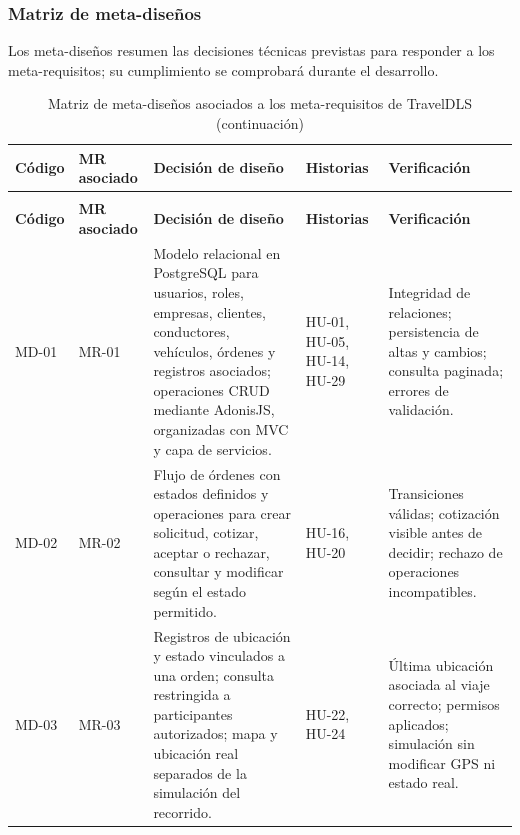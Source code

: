 \subsubsection{Matriz de meta-diseños}

Los meta-diseños resumen las decisiones técnicas previstas para responder a los meta-requisitos; su cumplimiento se comprobará durante el desarrollo.


\begingroup
	\small
	\setlength{\tabcolsep}{4.5pt}
	\renewcommand{\arraystretch}{1.45}
	\begin{longtable}{@{}>{\RaggedRight\arraybackslash}p{1.5cm}>{\RaggedRight\arraybackslash}p{1.8cm}>{\RaggedRight\arraybackslash}p{4.1cm}>{\RaggedRight\arraybackslash}p{2.3cm}>{\RaggedRight\arraybackslash}p{5.3cm}@{}}
		\caption{Matriz de meta-diseños asociados a los meta-requisitos de TravelDLS}\label{tab:meta_disenos}\\
		\toprule
		\textbf{Código} & \textbf{MR asociado} & \textbf{Decisión de diseño} & \textbf{Historias} & \textbf{Verificación} \\
		\midrule
		\endfirsthead
		\caption[]{Matriz de meta-diseños asociados a los meta-requisitos de TravelDLS (continuación)}\\
		\toprule
		\textbf{Código} & \textbf{MR asociado} & \textbf{Decisión de diseño} & \textbf{Historias} & \textbf{Verificación} \\
		\midrule
		\endhead
		\endfoot
		\bottomrule
		\endlastfoot
		MD-01 & MR-01 & Modelo relacional en PostgreSQL para usuarios, roles, empresas, clientes, conductores, vehículos, órdenes y registros asociados; operaciones CRUD mediante AdonisJS, organizadas con MVC y capa de servicios. & HU-01, HU-05, HU-14, HU-29 & Integridad de relaciones; persistencia de altas y cambios; consulta paginada; errores de validación. \\ \midrule
		MD-02 & MR-02 & Flujo de órdenes con estados definidos y operaciones para crear solicitud, cotizar, aceptar o rechazar, consultar y modificar según el estado permitido. & HU-16, HU-20 & Transiciones válidas; cotización visible antes de decidir; rechazo de operaciones incompatibles. \\ \midrule
		MD-03 & MR-03 & Registros de ubicación y estado vinculados a una orden; consulta restringida a participantes autorizados; mapa y ubicación real separados de la simulación del recorrido. & HU-22, HU-24 & Última ubicación asociada al viaje correcto; permisos aplicados; simulación sin modificar GPS ni estado real. \\ \midrule

\end{longtable}
